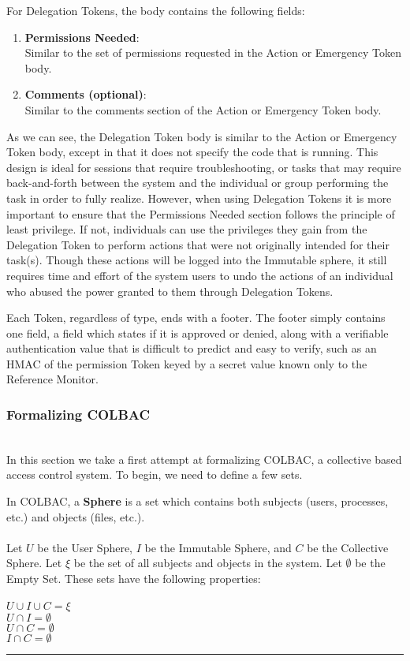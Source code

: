 For Delegation Tokens, the body contains the following fields:
\begin{enumerate}
\item \textbf{Permissions Needed}:\\
Similar to the set of permissions requested in the Action or Emergency Token
body.
\item \textbf{Comments (optional)}:\\
Similar to the comments section of the Action or Emergency Token body.
\end{enumerate}

As we can see, the Delegation Token body is similar to the Action or Emergency
Token body, except in that it does not specify the code that is running. This
design is ideal for sessions that require troubleshooting, or tasks that may
require back-and-forth between the system and the individual or group performing
the task in order to fully realize. However, when using Delegation Tokens it is
more important to ensure that the Permissions Needed section follows the
principle of least privilege. If not, individuals can use the privileges they
gain from the Delegation Token to perform actions that were not originally
intended for their task(s). Though these actions will be logged into the
Immutable sphere, it still requires time and effort of the system users to undo
the actions of an individual who abused the power granted to them through
Delegation Tokens.

Each Token, regardless of type, ends with a footer. The footer simply contains
one field, a field which states if it is approved or denied, along with a
verifiable authentication value that is difficult to predict and easy to verify,
such as an HMAC of the permission Token keyed by a secret value known only to
the Reference Monitor.

\subsubsection{Formalizing COLBAC}
\label{sec:colbacformal}
\mbox{}\\
In this section we take a first attempt at formalizing COLBAC, a collective
based access control system. To begin, we need to define a few sets.
\begin{definition}\label{def:spheres}
In COLBAC, a \textbf{Sphere} is a set which contains both subjects (users,
processes, etc.) and objects (files, etc.).\\
\mbox{}\\
Let $U$ be the User Sphere, $I$ be the Immutable Sphere, and $C$ be the
Collective Sphere. Let $\xi$ be the set of all subjects and objects in the
system. Let $\emptyset$ be the Empty Set. These sets have the following
properties:\\
\mbox{}\\
$U \cup I \cup C = \xi$\\
$U \cap I = \emptyset$\\
$U \cap C = \emptyset$\\
$I \cap C = \emptyset$\\
\hrule \mbox{}\\
\end{definition}

